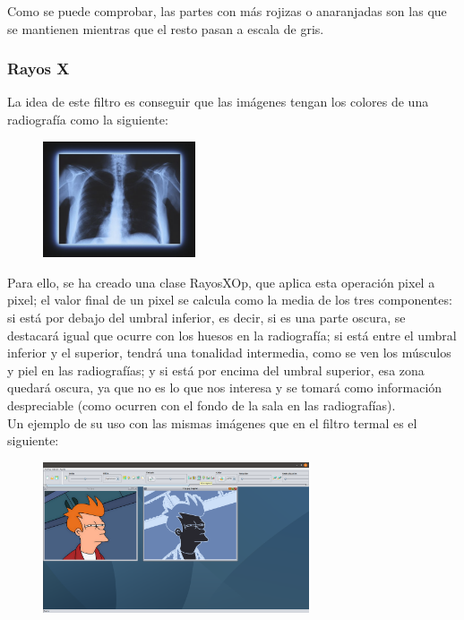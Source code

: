 \documentclass[11pt,a4paper]{article}
\begin{document}
Como se puede comprobar, las partes con más rojizas o anaranjadas son las que se mantienen mientras que el resto pasan a escala de gris.

\subsubsection{Rayos X}
La idea de este filtro es conseguir que las imágenes tengan los colores de una radiografía como la siguiente:

\begin{figure}[H]
\centering
	\includegraphics[width=0.4\textwidth]{img/ejemplo.png}
\end{figure}

Para ello, se ha creado una clase RayosXOp, que aplica esta operación pixel a pixel; el valor final de un pixel se calcula como la media de los tres componentes: si está por debajo del umbral inferior, es decir, si es una parte oscura, se destacará igual que ocurre con los huesos en la radiografía; si está entre el umbral inferior y el superior, tendrá una tonalidad intermedia, como se ven los músculos y piel en las radiografías; y si está por encima del umbral superior, esa zona quedará oscura, ya que no es lo que nos interesa y se tomará como información despreciable (como ocurren con el fondo de la sala en las radiografías).\\

Un ejemplo de su uso con las mismas imágenes que en el filtro termal es el siguiente:

\begin{figure}[H]
\centering
	\includegraphics[width=0.7\textwidth]{img/rayosx.png}
\end{figure}
\end{document}
